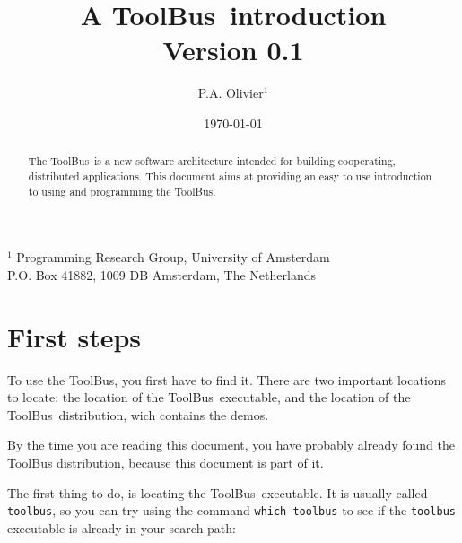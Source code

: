 \setlength{\oddsidemargin}{0.235cm}
\setlength{\evensidemargin}{0.235cm}
\setlength{\textwidth}{16cm}
\topmargin 0.5cm  %
\pagestyle{myheadings}


\newcommand{\TB}{{\sc ToolBus}}
\newcommand{\T}{{\bf T}}
\newcommand{\spec}[1]{{\rm #1}}
\newcommand{\script}[1]{{\tt #1}}
\newcommand{\ASFSDF}{{\sc Asf+Sdf}}
\newcommand{\ASF}{{\sc Asf}}
\newcommand{\SDF}{{\sc Sdf}}
\newcommand{\GEL}{{\sc Gel}}
\newcommand{\iter}{\,^*\,}
\newcommand{\emp}[1]{{\em #1}}
\newcommand{\txttt}[1]{{\tt #1}}



\title{A \TB\ introduction \\
Version 0.1}
\author{P.A. Olivier$^{1}$}
\date{\today}
\maketitle
\begin{center}
       {\footnotesize $^1$ Programming Research Group, University of Amsterdam\\
        P.O. Box 41882, 1009 DB Amsterdam, The Netherlands}
\end{center}

\begin{abstract}

The \TB\ is a new software architecture intended for building
cooperating, distributed applications.  This document aims
at providing an easy to use introduction to using and programming
the ToolBus.
\end{abstract}

\tableofcontents

\newpage

\section{First steps}

To use the \TB, you first have to find it. There are two important
locations to locate: the location of the \TB\ executable, and the
location of the \TB\ distribution, wich contains the demos.

By the time you are reading this document, you have probably already
found the ToolBus distribution, because this document is part of it.

The first thing to do, is locating the \TB\ executable. It is usually
called {\tt toolbus}, so you can try using the command {\tt which toolbus}
to see if the {\tt toolbus} executable is already in your
search path:

